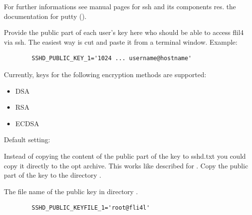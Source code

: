 \begin{description}

  For further informations see manual pages for ssh and its components 
  res. the documentation for putty
  ().


  Provide the public part of each user's key here who should be 
  able to access flil4 via ssh. The easiest way is cut and paste it 
  from a terminal window. Example:

\begin{example}
\begin{verbatim}
        SSHD_PUBLIC_KEY_1='1024 ... username@hostname'
\end{verbatim}
\end{example}


Currently, keys for the following encryption methods are supported:
  \begin{itemize}
  \item DSA
  \item RSA
  \item ECDSA
  \end{itemize}


  Default setting: 

  Instead of copying the content of the public part of the key to 
  sshd.txt you could copy it directly to the opt archive. This works 
  like described for . Copy the public part 
  of the key to the directory .


  The file name of the public key in directory .

\begin{example}
\begin{verbatim}
        SSHD_PUBLIC_KEYFILE_1='root@fli4l'
\end{verbatim}
\end{example}


\end{description}
